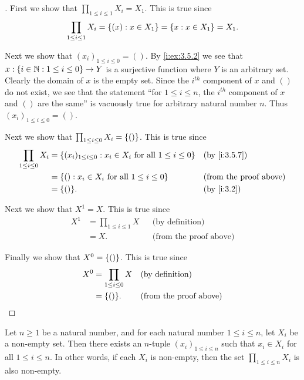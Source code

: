 \begin{proof}[]
  First we show that \(\prod_{1 \leq i \leq 1} X_i = X_1\).
  This is true since
  \[
    \prod_{1 \leq i \leq 1} X_i = \left\lbrace(x) : x \in X_1\right\rbrace = \left\lbrace x : x \in X_1\right\rbrace = X_1.
  \]

  Next we show that \((x_i)_{1 \leq i \leq 0} = ()\).
  By \cref{i:ex:3.5.2} we see that \(x : \left\lbrace i \in \mathbb{N} : 1 \leq i \leq 0\right\rbrace \to Y\) is a surjective function where \(Y\) is an arbitrary set.
  Clearly the domain of \(x\) is the empty set.
  Since the \(i^{th}\) component of \(x\) and \(()\) do not exist, we see that the statement ``for \(1 \leq i \leq n\), the \(i^{th}\) component of \(x\) and \(()\) are the same'' is vacuously true for arbitrary natural number \(n\).
  Thus \((x_i)_{1 \leq i \leq 0} = ()\).

  Next we show that \(\prod_{1 \leq i \leq 0} X_i = \left\lbrace()\right\rbrace\).
  This is true since
  \begin{align*}
    \prod_{1 \leq i \leq 0} X_i & = \set{(x_i)_{1 \leq i \leq 0} : x_i \in X_i \text{ for all } 1 \leq i \leq 0} &  & \by{i:3.5.7}                  \\
                                & = \set{() : x_i \in X_i \text{ for all } 1 \leq i \leq 0}                      &  & \text{(from the proof above)} \\
                                & = \set{()}.                                                                    &  & \by{i:3.2}
  \end{align*}

  Next we show that \(X^1 = X\).
  This is true since
  \begin{align*}
    X^1 & = \prod_{1 \leq i \leq 1} X &  & \text{(by definition)}        \\
        & = X.                        &  & \text{(from the proof above)}
  \end{align*}

  Finally we show that \(X^0 = \left\lbrace()\right\rbrace\).
  This is true since
  \begin{align*}
    X^0 & = \prod_{1 \leq i \leq 0} X &  & \text{(by definition)}        \\
        & = \set{()}.                 &  & \text{(from the proof above)}
  \end{align*}
\end{proof}

\setcounter{thm}{11}
\begin{lem}\label{i:3.5.12}
  Let \(n \geq 1\) be a natural number, and for each natural number \(1 \leq i \leq n\), let \(X_i\) be a non-empty set.
  Then there exists an \(n\)-tuple \((x_i)_{1 \leq i \leq n}\) such that \(x_i \in X_i\) for all \(1 \leq i \leq n\).
  In other words, if each \(X_i\) is non-empty, then the set \(\prod_{1 \leq i \leq n} X_i\) is also non-empty.
\end{lem}


